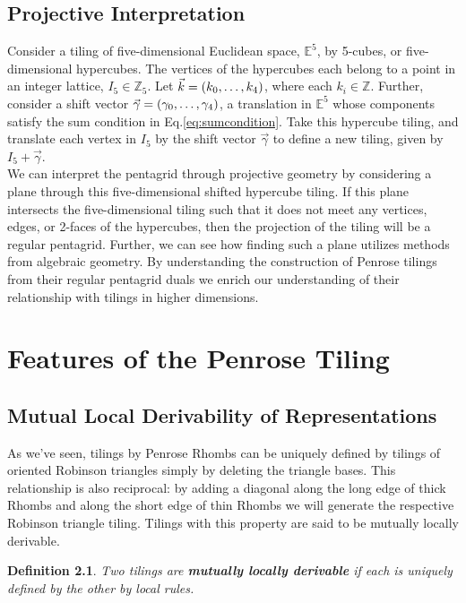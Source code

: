 \documentclass[
  oneside,
  11pt, a4paper,
  footinclude=true,
  headinclude=true,
  cleardoublepage=empty
]{scrbook}
\newtheorem{mydef}{Definition}
\begin{document}
\section{Projective Interpretation}
Consider a tiling of five-dimensional Euclidean space, $\mathbb{E}^5$, by 5-cubes, or five-dimensional hypercubes. The vertices of the hypercubes each belong to a point in an integer lattice, $I_5 \in \mathbb{Z}_5$. Let $\vec{k}=(k_0,\mathellipsis, k_4)$, where each $k_i \in \mathbb{Z}$. Further, consider a shift vector $\vec{\gamma}=(\gamma_0,\mathellipsis, \gamma_4)$, a translation in $\mathbb{E}^5$ whose components satisfy the sum condition in Eq.\ref{eq:sumcondition}. Take this hypercube tiling, and translate each vertex in $I_5$ by the shift vector $\vec{\gamma}$ to define a new tiling, given by $I_5 + \vec{\gamma}$.\\
We can interpret the pentagrid through projective geometry by considering a plane through this five-dimensional shifted hypercube tiling. If this plane intersects the five-dimensional tiling such that it does not meet any vertices, edges, or 2-faces of the hypercubes, then the projection of the tiling will be a regular pentagrid. Further, we can see how finding such a plane utilizes methods from algebraic geometry. 
By understanding the construction of Penrose tilings from their regular pentagrid duals we enrich our understanding of their relationship with tilings in higher dimensions.


\chapter{Features of the Penrose Tiling}
\section{Mutual Local Derivability of Representations} %
As we've seen, tilings by Penrose Rhombs can be uniquely defined by tilings of oriented Robinson triangles simply by deleting the triangle bases. This relationship is also reciprocal: by adding a diagonal along the long edge of thick Rhombs and along the short edge of thin Rhombs we will generate the respective Robinson triangle tiling. Tilings with this property are said to be mutually locally derivable.

\begin{mydef}
Two tilings are \textbf{mutually locally derivable} if each is uniquely defined by the other by local rules. 
\end{mydef}
\end{document}
